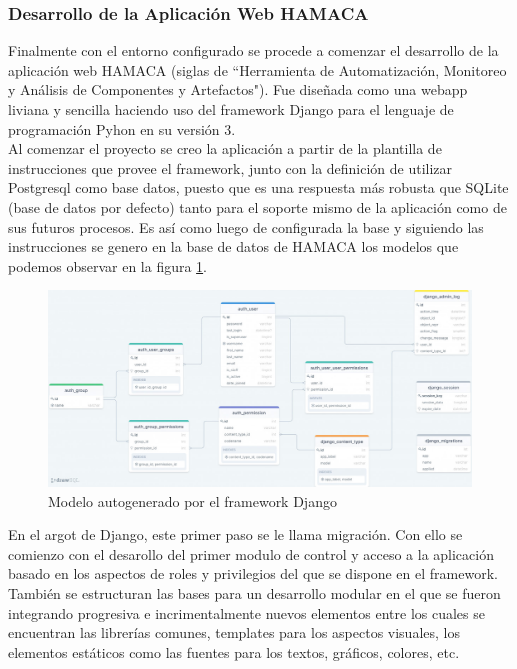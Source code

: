 \subsubsection{Desarrollo de la Aplicación Web HAMACA}
Finalmente con el entorno configurado se procede a comenzar el desarrollo de la aplicación web HAMACA (siglas de ``Herramienta de Automatización, Monitoreo y Análisis de Componentes y Artefactos"). Fue diseñada como una webapp liviana y sencilla haciendo uso del framework Django para el lenguaje de programación Pyhon en su versión 3.\\

Al comenzar el proyecto se creo la aplicación a partir de la plantilla de instrucciones que provee el framework, junto con la definición de utilizar Postgresql como base datos, puesto que es una respuesta más robusta que SQLite (base de datos por defecto) tanto para el soporte mismo de la aplicación como de sus futuros procesos. Es así como luego de configurada la base y siguiendo las instrucciones se genero en la base de datos de HAMACA los modelos que podemos observar en la figura \ref{fig:django_schema}.\\
\begin{figure}[!htb]
\centering
\includegraphics[scale=0.38]{./Figuras/django_schema.jpg}
\caption{Modelo autogenerado por el framework Django}
\label{fig:django_schema}
\vspace*{-10pt}
\end{figure}

En el argot de Django, este primer paso se le llama migración. Con ello se comienzo con el desarollo del primer modulo de control y acceso a la aplicación basado en los aspectos de roles y privilegios del que se dispone en el framework. También se estructuran las bases para un desarrollo modular en el que se fueron integrando progresiva e incrimentalmente nuevos elementos entre los cuales se encuentran las librerías comunes, templates para los aspectos visuales, los elementos estáticos como las fuentes para los textos, gráficos, colores, etc.\\

